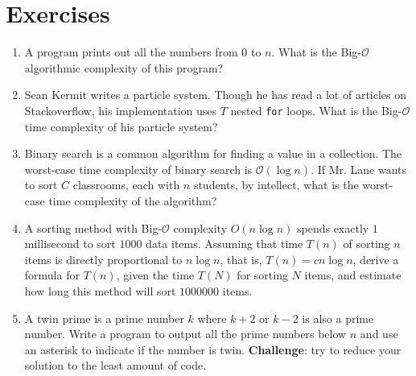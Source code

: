 \documentclass{cslesson}
\numberwithin{equation}{section}
\begin{document}
\section*{Exercises}
\begin{enumerate}[listparindent=0.7cm, align=left]
\item A program prints out all the numbers from $0$ to $n$. What is the Big-$\mathcal{O}$ algorithmic complexity of this program?
\item Sean Kermit writes a particle system. Though he has read a lot of articles on Stackoverflow, his implementation uses $T$ nested \texttt{for} loops. What is the Big-$\mathcal{O}$ time complexity of his particle system? 
\item Binary search is a common algorithm for finding a value in a collection. The worst-case time complexity of binary search is $\mathcal{O}(\log{n})$. If Mr. Lane wants to sort $C$ classrooms, each with $n$ students, by intellect, what is the worst-case time complexity of the algorithm?
\item A sorting method with Big-$\mathcal{O}$ complexity $O(n \log{n})$ spends exactly $1$
millisecond to sort $1000$ data items. Assuming that time $T(n)$ of sorting
$n$ items is directly proportional to $n \log{n}$, that is, $T(n) = cn \log{n}$, derive
a formula for $T(n)$, given the time $T(N)$ for sorting $N$ items, and estimate
how long this method will sort $1000000$ items.
\item A twin prime is a prime number $k$ where $k+2$ or $k-2$ is also a prime number. Write a program to output all the prime numbers below $n$ and use an asterisk to indicate if the number is twin. \textbf{Challenge}: try to reduce your solution to the least amount of code. 
\end{enumerate}
\end{document}
